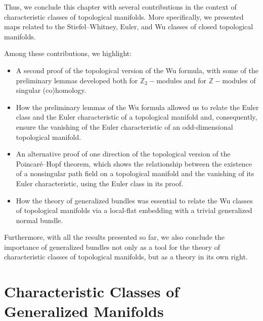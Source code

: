 \documentclass[12pt,oneside]{book}
\newcommand{\Z}{\mathbb{Z}}
\begin{document}
    Thus, we conclude this chapter with several contributions in the context of characteristic classes of topological manifolds. More 
    specifically, we presented maps related to the Stiefel–Whitney, Euler, and 
    Wu classes of closed topological manifolds.

    Among these contributions, we highlight:

    \begin{itemize}
        \item A second proof of the topological version of the Wu formula, with some of the preliminary lemmas developed 
        both for $\Z_{2}-$modules and for $\Z-$modules of singular (co)homology.
        \item How the preliminary lemmas of the Wu formula allowed us to relate the Euler class and the Euler 
        characteristic of a topological manifold and, consequently, ensure the vanishing of the Euler characteristic of an odd-dimensional 
        topological manifold.
        \item An alternative proof of one direction of the topological version of the Poincaré–Hopf theorem, 
        which shows the relationship between the existence of a nonsingular path field on a topological manifold 
        and the vanishing of its Euler characteristic, using the Euler class in its proof.
        \item How the theory of generalized bundles was essential to relate the Wu classes of topological manifolds via a 
        local-flat embedding with a trivial generalized normal 
        bundle.
    \end{itemize}

    Furthermore, with all the results presented so far, we also conclude the importance of generalized bundles not 
    only as a tool for the theory of characteristic classes of topological manifolds, but as a theory in its own 
    right.




    
    \chapter{Characteristic Classes of Generalized Manifolds}\label{cap_wu_gen}
    \thispagestyle{empty}
\end{document}
